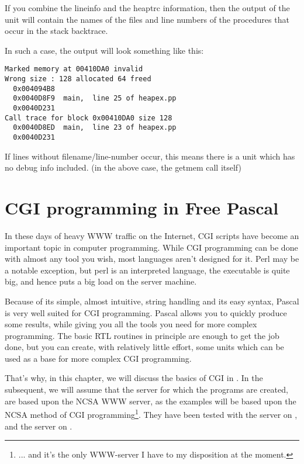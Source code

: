 \documentclass{report}
\begin{document}
If you combine the lineinfo and the heaptrc information, then the output
of the  unit will contain the names of the files and line
numbers of the procedures that occur in the stack backtrace.

In such a case, the output will look something like this:
\begin{verbatim}
Marked memory at 00410DA0 invalid
Wrong size : 128 allocated 64 freed
  0x004094B8
  0x0040D8F9  main,  line 25 of heapex.pp
  0x0040D231
Call trace for block 0x00410DA0 size 128
  0x0040D8ED  main,  line 23 of heapex.pp
  0x0040D231
\end{verbatim}
If lines without filename/line-number occur, this means there is a unit which
has no debug info included. (in the above case, the getmem call itself)


\chapter{CGI programming in Free Pascal}
\label{ch:CGIProgramming}

In these days of heavy WWW traffic on the Internet, CGI scripts have become
an important topic in computer programming. While CGI programming can be
done with almost any tool you wish, most languages aren't designed for it.
Perl may be a notable exception, but perl is an interpreted language, the
executable is quite big, and hence puts a big load on the server machine.

Because of its simple, almost intuitive, string handling and its easy syntax,
Pascal is very well suited for CGI programming. Pascal allows you to quickly
produce some results, while giving you all the tools you need for more
complex programming. The basic RTL routines in principle are enough to get
the job done, but you can create, with relatively little effort, some units
which can be used as a base for more complex CGI programming.

That's why, in this chapter, we will discuss the basics of CGI in \fpc.
In the subsequent, we will assume that the server for which the programs are
created, are based upon the NCSA  WWW server, as the examples
will be based upon the NCSA method of CGI programming\footnote{... and it's
the only WWW-server I have to my disposition at the moment.}.
They have been tested with the  server on \linux, and
the  server on \windowsnt.
\end{document}
